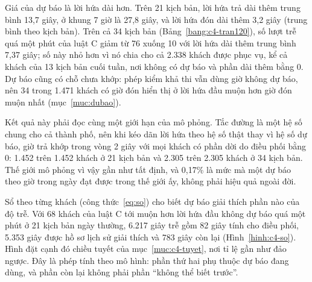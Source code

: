 Giá của dự báo là lời hứa dài hơn. Trên 21 kịch bản, lời hứa trả dài thêm trung bình 13,7 giây, ở khung 7 giờ là
27,8 giây, và lời hứa đón dài thêm 3,2 giây (trung bình theo kịch bản). Trên cả 34 kịch bản
(Bảng~\ref{bang:c4-tran120}), số lượt trễ quá một phút của luật C giảm từ 76 xuống 10 với lời hứa dài thêm trung
bình 7,37 giây; số này nhỏ hơn vì nó chia cho cả 2.338 khách được phục vụ, kể cả khách của 13 kịch bản cuối tuần,
nơi không có dự báo và phần dài thêm bằng 0. Dự báo cũng có chỗ chưa khớp: phép kiểm khả thi vẫn dùng giờ không dự
báo, nên 34 trong 1.471 khách có giờ đón hiển thị ở lời hứa đầu muộn hơn giờ đón muộn nhất (mục~\ref{muc:dubao}).

Kết quả này phải đọc cùng một giới hạn của mô phỏng. Tắc đường là một hệ số chung cho cả thành phố, nên khi kéo
dãn lời hứa theo hệ số thật thay vì hệ số dự báo, giờ trả khớp trong vòng 2 giây với mọi khách có phần dời do điều
phối bằng 0: 1.452 trên 1.452 khách ở 21 kịch bản và 2.305 trên 2.305 khách ở 34 kịch bản. Thế giới mô phỏng vì vậy
gần như tất định, và 0,17\% là mức mà một dự báo theo giờ trong ngày đạt được trong thế giới ấy, không phải hiệu
quả ngoài đời.

Sổ theo từng khách (công thức~\eqref{eq:so}) cho biết dự báo giải thích phần nào của độ trễ. Với 68 khách của luật
C tới muộn hơn lời hứa đầu không dự báo quá một phút ở 21 kịch bản ngày thường, 6.217 giây trễ gồm 82 giây tính cho
điều phối, 5.353 giây được hồ sơ lịch sử giải thích và 783 giây còn lại (Hình~\ref{hinh:c4-so}). Hình đặt cạnh đó
chiều tuyết của mục~\ref{muc:c4-tuyet}, nơi tỉ lệ gần như đảo ngược. Đây là phép tính theo mô hình: phần thứ hai phụ
thuộc dự báo đang dùng, và phần còn lại không phải phần ``không thể biết trước''.

